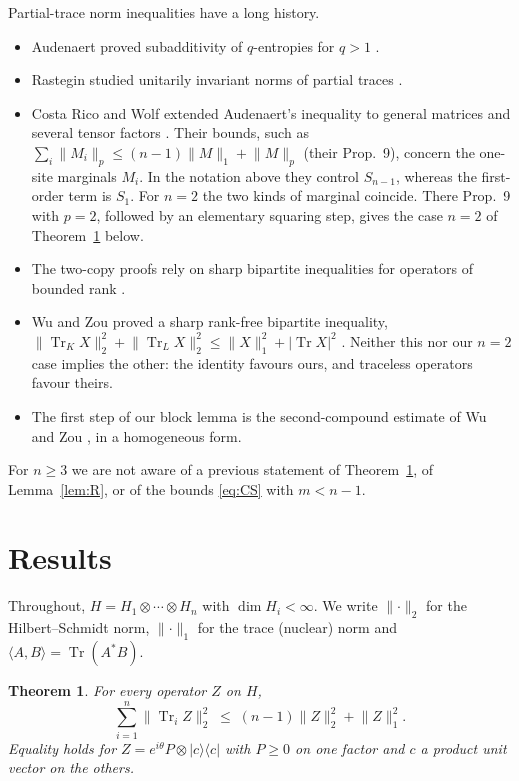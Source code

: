 \documentclass[11pt]{article}
\newtheorem{theorem}{Theorem}
\theoremstyle{remark}
\newcommand{\Tr}{\operatorname{Tr}}
\newcommand{\norm}[1]{\lVert #1\rVert}
\begin{document}
Partial-trace norm inequalities have a long history.
\begin{itemize}
\item Audenaert proved subadditivity of $q$-entropies for $q>1$ \cite{Aud}.
\item Rastegin studied unitarily invariant norms of partial traces \cite{Ras}.
\item Costa Rico and Wolf extended Audenaert's inequality to general matrices and several tensor factors \cite{CRW}.
Their bounds, such as $\sum_i\norm{M_i}_p\le(n-1)\norm{M}_1+\norm{M}_p$ (their Prop.~9), concern the one-site marginals
$M_i$. In the notation above they control $S_{n-1}$, whereas the first-order term is $S_1$. For $n=2$ the two kinds of
marginal coincide. There Prop.~9 with $p=2$, followed by an elementary squaring step, gives the case $n=2$ of
Theorem~\ref{thm:main} below.
\item The two-copy proofs rely on sharp bipartite inequalities for operators of bounded rank \cite{FHPV,BGH}.
\item Wu and Zou proved a sharp rank-free bipartite inequality,
$\norm{\Tr_KX}_2^2+\norm{\Tr_LX}_2^2\le\norm{X}_1^2+|\Tr X|^2$ \cite[Thm.~1.1]{WuZou}. Neither this nor our $n=2$ case
implies the other: the identity favours ours, and traceless operators favour theirs.
\item The first step of our block lemma is the second-compound estimate of Wu and Zou \cite[Lemma~5.1]{WuZou}, in a
homogeneous form.
\end{itemize}
For $n\ge3$ we are not aware of a previous statement of Theorem~\ref{thm:main}, of Lemma~\ref{lem:R}, or of the bounds
\eqref{eq:CS} with $m<n-1$.

\section{Results}

Throughout, $H=H_1\otimes\cdots\otimes H_n$ with $\dim H_i<\infty$. We write $\norm{\cdot}_2$ for the
Hilbert--Schmidt norm, $\norm{\cdot}_1$ for the trace (nuclear) norm and $\langle A,B\rangle=\Tr(A^*B)$.

\begin{theorem}\label{thm:main}
For every operator $Z$ on $H$,
\begin{equation}\label{eq:main}
\sum_{i=1}^n\norm{\Tr_iZ}_2^2\;\le\;(n-1)\norm{Z}_2^2+\norm{Z}_1^2 .
\end{equation}
Equality holds for $Z=e^{i\theta}P\otimes|c\rangle\langle c|$ with $P\ge0$ on one factor and $c$ a product unit vector
on the others.
\end{theorem}
\end{document}
